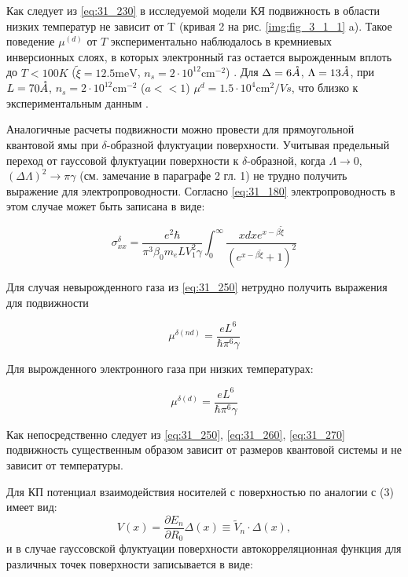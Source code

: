 Как следует из \eqref{eq:31_230} в исследуемой модели КЯ подвижность в области низких температур не зависит от T (кривая 2 на рис. \ref{img:fig_3_1_1} a). Такое поведение $\mu ^{(d)} $ от $T$ экспериментально наблюдалось в кремниевых инверсионных слоях, в которых электронный газ остается вырожденным вплоть до $T<100 K$ ($\tilde{\xi }=12.5 \text{meV}$, $n_{s} =2\cdot 10^{12} \text{cm}^{-2} $) \cite{Stern1980}. Для $\Delta =6\AA$, $\Lambda =13 \AA$, при $L=70 \AA$, $n_{s} =2\cdot 10^{12}  \text{cm}^{-2} $ ($a<<1$) $\mu ^{d} =1.5\cdot 10^{4} \text{cm}^{2} /{Vs}$, что близко к экспериментальным данным \cite{Stern1980}.

Аналогичные расчеты подвижности можно провести для прямоугольной квантовой ямы при $\delta $-образной флуктуации поверхности. Учитывая предельный переход от гауссовой флуктуации поверхности к $\delta $-образной, когда $\Lambda \to 0$, ${\left(\Delta \Lambda \right)}^2\to \pi \gamma $ (см. замечание в параграфе 2 гл. 1) не трудно получить выражение для электропроводности. Согласно \eqref{eq:31_180} электропроводность в этом случае может быть записана в виде:

\begin{equation} \label{eq:31_250}
{\sigma }^{\delta }_{xx}=\frac{e^2\hbar }{{\pi }^3{\beta }_0m_eLV^2_1\gamma }\int^{\infty }_0{\frac{xd xe^{x-\beta \widetilde{\xi }}}{{\left(e^{x-\beta \widetilde{\xi }}+1\right)}^2}}
\end{equation} 

\noindent Для случая невырожденного газа из \eqref{eq:31_250} нетрудно получить выражения для подвижности

\begin{equation} \label{eq:31_260}
{\mu }^{\delta \left(nd\right)}=\frac{eL^6}{\hbar {\pi }^6\gamma }
\end{equation}

\noindent Для вырожденного электронного газа при низких температурах:

\begin{equation} \label{eq:31_270}
{\mu }^{\delta \left(d\right)}=\frac{eL^6}{\hbar {\pi }^6\gamma }
\end{equation}


\noindent Как непосредственно следует из \eqref{eq:31_250}, \eqref{eq:31_260}, \eqref{eq:31_270} подвижность существенным образом зависит от размеров квантовой системы и не зависит от температуры.

Для КП потенциал взаимодействия носителей с поверхностью по аналогии с (3) имеет вид:
\[
V(x)=\frac{\partial E_{n} }{\partial R_{0} } \Delta (x)\equiv \tilde{V}_{n} \cdot \Delta (x),
\] 
и в случае гауссовской флуктуации поверхности автокорреляционная функция для различных точек поверхности записывается в виде:

